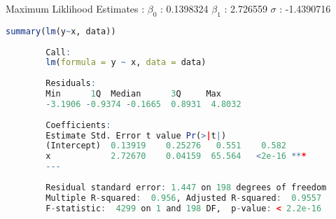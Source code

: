\documentclass[12pt,letterpaper]{article}
\begin{document}
  	 	\text
  	 { Maximum Liklihood Estimates : 
  	 	$\beta_0$	: 0.1398324
  	 	$\beta_1$ : 2.726559
  	 	$\sigma $ : -1.4390716}
  		
  		\begin{lstlisting}[language=R]
  		summary(lm(y~x, data))
  		
  		Call:
  		lm(formula = y ~ x, data = data)
  		
  		Residuals:
  		Min      1Q  Median      3Q     Max 
  		-3.1906 -0.9374 -0.1665  0.8931  4.8032 
  		
  		Coefficients:
  		Estimate Std. Error t value Pr(>|t|)    
  		(Intercept)  0.13919    0.25276   0.551    0.582    
  		x            2.72670    0.04159  65.564   <2e-16 ***
  		---
  	
  		Residual standard error: 1.447 on 198 degrees of freedom
  		Multiple R-squared:  0.956,	Adjusted R-squared:  0.9557 
  		F-statistic:  4299 on 1 and 198 DF,  p-value: < 2.2e-16
  		 \end{lstlisting}
        
   
\end{document}
